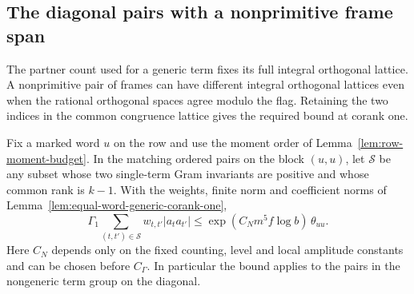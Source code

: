 \subsection{The diagonal pairs with a nonprimitive frame span}

The partner count used for a generic term fixes its full integral
orthogonal lattice. A nonprimitive pair of frames can have different
integral orthogonal lattices even when the rational orthogonal spaces
agree modulo the flag. Retaining the two indices in the common
congruence lattice gives the required bound at corank one.

\begin{auxlemma}\label{lem:nonprimitive-diagonal}
Fix a marked word \(u\) on the row and use the moment order of
Lemma~\ref{lem:row-moment-budget}. In the matching ordered pairs on
the block \((u,u)\), let \(\mathcal S\) be any subset whose two
single-term Gram invariants are positive and whose common rank is
\(k-1\). With the weights, finite norm and coefficient norms of
Lemma~\ref{lem:equal-word-generic-corank-one},
\begin{equation}\label{eq:nonprimitive-diagonal}
  \Gamma_1\sum_{(t,t')\in\mathcal S}w_{t,t'}|a_t a_{t'}|
       \le \exp(C_N m^5f\log b)\,\theta_{uu}.
\end{equation}
Here \(C_N\) depends only on the fixed counting, level and local
amplitude constants and can be chosen before \(C_\Gamma\).
In particular the bound applies to the pairs in the nongeneric
term group on the diagonal.
\end{auxlemma}


